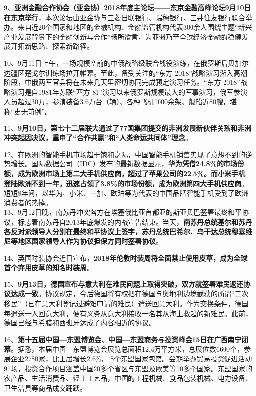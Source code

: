 9、{\textbf{亚洲金融合作协会（亚金协）2018年度主论坛------东京金融高峰论坛9月10日在东京举行}}，本次论坛由亚金协与三菱日联银行、瑞穗银行、三井住友银行联合举办。来自近20个国家和地区的金融机构、金融监管机构代表300余人围绕主题``新兴产业发展背景下的金融创新与合作''畅所欲言，为亚洲乃至全球经济金融的稳健发展开拓新思路、探索新路径。

10、9月11日上午，一场规模空前的中俄战略级联合战役演练，在俄罗斯后贝加尔边疆区楚戈尔训练场拉开帷幕。至此，备受关注的``东方-2018''战略演习渐入高潮阶段，中俄两军官兵将在未来几天里密切协同完成预定演习任务。``东方-2018''战略演习是自1981年苏联``西方-81''演习以来俄罗斯规模最大的军事演习，俄军参演人员超过30万，参演装备3.6万台（辆）、各种飞机1000余架、舰船近80艘，堪称``史无前例''。

11、{\textbf{9月10日，第七十二届联大通过了77国集团提交的非洲发展新伙伴关系和非洲冲突起因决议，重申了``合作共赢''和``人类命运共同体''理念}}。

12、在欧洲的智能手机市场趋于饱和之际，中国智能手机销售实现了意想不到的逆势增长。国际数据公司（IDC）发布的最新数据显示，{\textbf{华为凭借24.8\%的市场份额，成为欧洲市场上第二大手机供应商，超过了苹果公司的22.5\%。而小米手机登陆欧洲不到一年，迅速占领了3.8\%的市场份额，成为欧洲第四大手机供应商}}。短短8年间，以华为、小米、一加、欧珀等为代表的中国品牌智能手机受到了欧洲消费者的热捧。\\

13、9月12日晚，南苏丹冲突各方在埃塞俄比亚首都亚的斯亚贝巴签署最终和平协议，标志着南苏丹自2013年底爆发的内战宣告结束。当天，{\textbf{南苏丹总统基尔和苏丹各反对派领导人分别在最终和平协议上签字，苏丹总统巴希尔、乌干达总统穆塞维尼等地区国家领导人作为协议担保方同时签署协议}}。

14、英国时装协会近日宣布，{\textbf{2018年伦敦时装周将全面禁止使用皮草，成为全球首个弃用皮草的知名时装周}}。

15、{\textbf{9月13日，德国宣布与意大利在难民问题上取得突破，双方就签署难民返还协议达成一致}}。协议规定，今后德国将有权把在德国与奥地利边境截获的所谓``二次移民''（已在意大利登记过避难申请的难民）遣送回意大利。作为交换条件，德国每遣送一人回意大利，便有义务从意大利接收一名其从海上救起的新难民。此前，德国已经与希腊和西班牙达成了内容相近的协议。

16、{\textbf{第十五届中国---东盟博览会、中国---东盟商务与投资峰会15日在广西南宁闭幕}}。据悉，本届中国---东盟博览会展览总面积12.4万平方米，总展位数6600个，参展企业2780家，比上届增长2.6\%，
8个东盟国家包馆。会期举办贸易投资促进活动91场，投资合作项目涵盖中国20多个省区与东盟及欧美等10多个国家。东盟国家的农产品、生活消费品、轻工工艺品，中国的工程机械、食品包装机械、电力设备、卫生洁具等商品成交踊跃。

